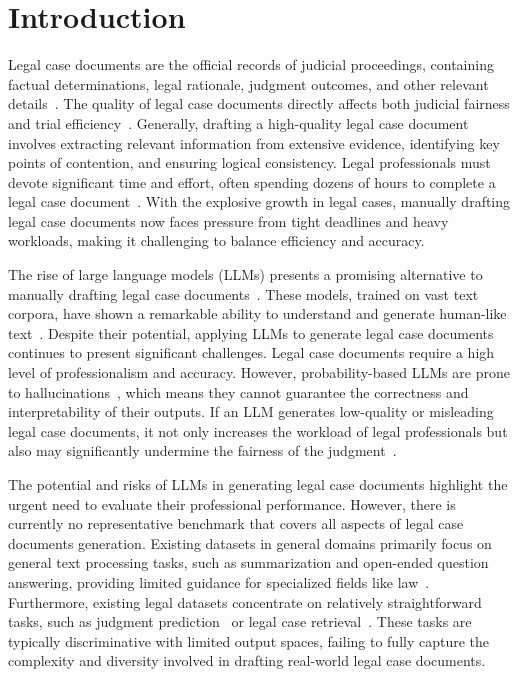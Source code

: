 \section{Introduction}
Legal case documents are the official records of judicial proceedings, containing factual determinations, legal rationale, judgment outcomes, and other relevant details~\cite{li2024deltapretraindiscriminativeencoder,li2023sailer}.
The quality of legal case documents directly affects both judicial fairness and trial efficiency~\cite{li2024lecardv2}. 
Generally, drafting a high-quality legal case document involves extracting relevant information from extensive evidence, identifying key points of contention, and ensuring logical consistency. Legal professionals must devote significant time and effort, often spending dozens of hours to complete a legal case document~\cite{branting1998techniques,10.1145/3626093}. 
With the explosive growth in legal cases, manually drafting legal case documents now faces pressure from tight deadlines and heavy workloads, making it challenging to balance efficiency and accuracy.


The rise of large language models (LLMs) presents a promising alternative to manually drafting legal case documents~\cite{lai2024large}. These models, trained on vast text corpora, have shown a remarkable ability to understand and generate human-like text~\cite{achiam2023gpt}. Despite their potential, applying LLMs to generate legal case documents continues to present significant challenges.  
Legal case documents require a high level of professionalism and accuracy.
However, probability-based LLMs are prone to hallucinations~\cite{perkovic2024hallucinations}, which means they cannot guarantee the correctness and interpretability of their outputs. If an LLM generates low-quality or misleading legal case documents, it not only increases the workload of legal professionals but also may significantly undermine the fairness of the judgment~\cite{lilexeval}.



The potential and risks of LLMs in generating legal case documents highlight the urgent need to evaluate their professional performance.
However, there is currently no representative benchmark that covers all aspects of legal case documents generation.
Existing datasets in general domains primarily focus on general text processing tasks, such as summarization and open-ended question answering, providing limited guidance for specialized fields like law~\cite{huang2024c,wang2024mmlu}.
Furthermore, existing legal datasets concentrate on relatively straightforward tasks, such as judgment prediction~\cite{xiao2018cail2018} or legal case retrieval~\cite{li2024towards}.
These tasks are typically discriminative with limited output spaces, failing to fully capture the complexity and diversity involved in drafting real-world legal case documents.




